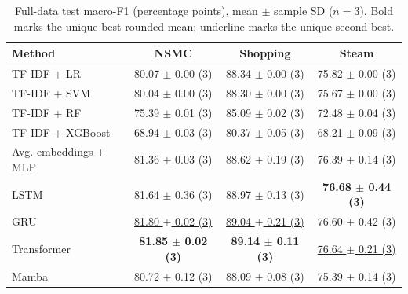 \begin{table}[t]
\centering
\caption{Full-data test macro-F1 (percentage points), mean $\pm$ sample SD ($n=3$). Bold marks the unique best rounded mean; underline marks the unique second best.}
\label{tab:full-data}
\scriptsize
\begin{tabular}{lccc}
\toprule
Method & NSMC & Shopping & Steam \\
\midrule
TF-IDF + LR & 80.07 $\pm$ 0.00 (3) & 88.34 $\pm$ 0.00 (3) & 75.82 $\pm$ 0.00 (3) \\
TF-IDF + SVM & 80.04 $\pm$ 0.00 (3) & 88.30 $\pm$ 0.00 (3) & 75.67 $\pm$ 0.00 (3) \\
TF-IDF + RF & 75.39 $\pm$ 0.01 (3) & 85.09 $\pm$ 0.02 (3) & 72.48 $\pm$ 0.04 (3) \\
TF-IDF + XGBoost & 68.94 $\pm$ 0.03 (3) & 80.37 $\pm$ 0.05 (3) & 68.21 $\pm$ 0.09 (3) \\
Avg. embeddings + MLP & 81.36 $\pm$ 0.03 (3) & 88.62 $\pm$ 0.19 (3) & 76.39 $\pm$ 0.14 (3) \\
LSTM & 81.64 $\pm$ 0.36 (3) & 88.97 $\pm$ 0.13 (3) & \textbf{76.68 $\pm$ 0.44 (3)} \\
GRU & \underline{81.80 $\pm$ 0.02 (3)} & \underline{89.04 $\pm$ 0.21 (3)} & 76.60 $\pm$ 0.42 (3) \\
Transformer & \textbf{81.85 $\pm$ 0.02 (3)} & \textbf{89.14 $\pm$ 0.11 (3)} & \underline{76.64 $\pm$ 0.21 (3)} \\
Mamba & 80.72 $\pm$ 0.12 (3) & 88.09 $\pm$ 0.08 (3) & 75.39 $\pm$ 0.14 (3) \\
\bottomrule
\end{tabular}
\end{table}
